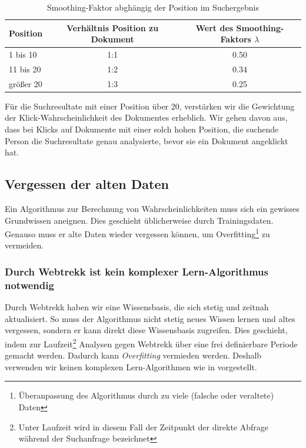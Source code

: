 \begin{table}[H]
\centering
\vspace{-.75em}
 \caption[Smoothing-Faktor abghängig der Position im Suchergebnis]{Smoothing-Faktor abghängig der Position im Suchergebnis}
\label{tab:VerhaeltnisKlick-WahrscheinlichkeitenPositionDokument}
\vspace{-.5em}
\renewcommand*{\arraystretch}{1.2}
\begin{tabular}{lcc} \hline
	\textbf{Position} & \textbf{Verhältnis Position zu Dokument} & \textbf{Wert des Smoothing-Faktors $\lambda$}\\ \hline
	1 bis 10 & 1:1 & 0.50\\ \hline
	11 bis 20 & 1:2 & 0.34\\ \hline
	größer 20 &  1:3 & 0.25\\ \hline
 \end{tabular}
\vspace{-2em}
\end{table}

Für die Suchresultate mit einer Position über 20, verstärken wir die Gewichtung der Klick-Wahrscheinlichkeit des Dokumentes erheblich. Wir gehen davon aus, dass bei Klicks auf Dokumente mit einer solch hohen Position, die suchende Person die Suchresultate genau analysierte, bevor sie ein Dokument angeklickt hat.

\subsection{Vergessen der alten Daten}
\label{sec:Reranking:Methodik:Vergessen}

Ein Algorithmus zur Berechnung von Wahrscheinlichkeiten muss sich ein gewisses Grundwissen aneignen. Dies geschieht üblicherweise durch Trainingsdaten. Genauso muss er alte Daten wieder vergessen können, um Overfitting\footnote{Überanpassung des Algorithmus durch zu viele (falsche oder veraltete) Daten} zu vermeiden. 

\subsubsection{Durch Webtrekk ist kein komplexer Lern-Algorithmus notwendig}
\label{sec:Reranking:Methodik:Vergessen:Lern-Algorithmus}

Durch Webtrekk haben wir eine Wissensbasis, die sich stetig und zeitnah aktualisiert. So muss der Algorithmus nicht stetig neues Wissen lernen und altes vergessen, sondern er kann direkt diese Wissensbasis zugreifen. Dies geschieht, indem zur Laufzeit\footnote{Unter Laufzeit wird in diesem Fall der Zeitpunkt der direkte Abfrage während der Suchanfrage bezeichnet} Analysen gegen Webtrekk über eine frei definierbare Periode gemacht werden. Dadurch kann \textit{Overfitting} vermieden werden. Deshalb verwenden wir keinen komplexen Lern-Algorithmen wie in \cite{IWUSBI} vorgestellt.

